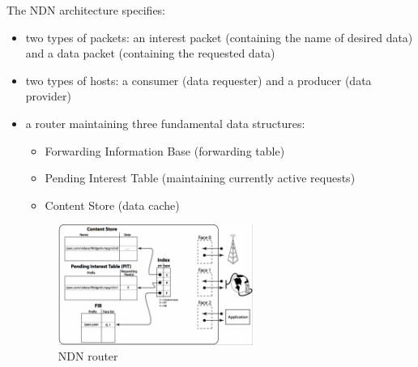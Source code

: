                 The NDN architecture specifies:
                    \begin{itemize}
                        \item two types of packets: an interest packet (containing the name of desired data) and a data packet (containing the requested data)
                        \item two types of hosts: a consumer (data requester) and a producer (data provider)
                        \item a router maintaining three fundamental data structures:
                        \begin{itemize}
                            \item Forwarding Information Base (forwarding table)
                            \item Pending Interest Table (maintaining currently active requests)
                            \item Content Store (data cache)
                        \end{itemize}
                        \begin{figure}[H]
                            \begin{center}
                                \includegraphics[width=0.6\textwidth]{fig/archs_ndn-router.png}
                              \caption{NDN router}
                              \label{fig:ndn-router}
                            \end{center}
                        \end{figure}

                    \end{itemize}

